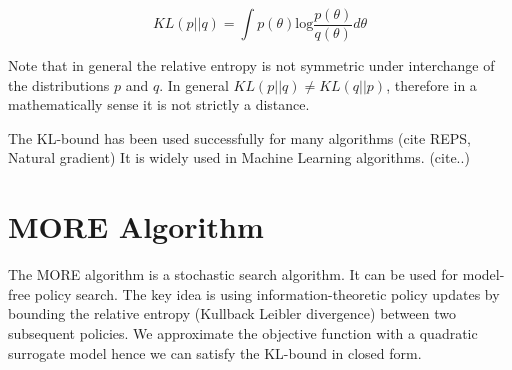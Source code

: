 $$ KL(p || q) = \int p(\theta) \text{log} \frac{p(\theta)}{q(\theta)} d \theta $$

Note that in general the relative entropy is not symmetric under interchange of the
distributions $p$ and $q$. In general $KL(p || q) \neq KL(q || p) $, therefore
in a mathematically sense it is not strictly a distance.

The KL-bound has been used successfully for many algorithms (cite REPS, Natural gradient)
It is widely used in Machine Learning algorithms. (cite..)


%
%
%
%
%
%

\section{MORE Algorithm}
The MORE algorithm is a stochastic search algorithm. It can be used for
model-free policy search. The key idea is using information-theoretic policy updates
by bounding the relative entropy (Kullback Leibler divergence) between two subsequent
policies. We approximate the objective function with a quadratic surrogate model hence
we can satisfy the KL-bound in closed form.


